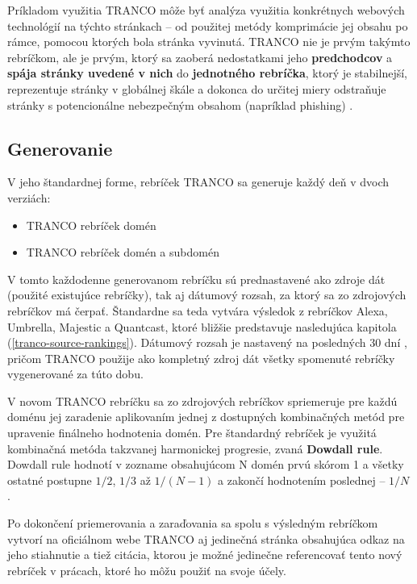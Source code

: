 Príkladom využitia TRANCO môže byť analýza využitia konkrétnych webových technológií na týchto stránkach -- od použitej metódy komprimácie jej obsahu po rámce, pomocou ktorých bola 
stránka vyvinutá. 
TRANCO nie je prvým takýmto rebríčkom, ale je prvým, ktorý sa zaoberá nedostatkami jeho \textbf{predchodcov} a \textbf{spája stránky uvedené v nich} do \textbf{jednotného rebríčka}, 
ktorý je stabilnejší, reprezentuje stránky v globálnej škále a dokonca do určitej miery odstraňuje stránky s potencionálne nebezpečným obsahom (napríklad phishing) \cite{tranco}. 

\subsection{Generovanie}
\label{tranco-generation}

V jeho štandardnej forme, rebríček TRANCO sa generuje každý deň v dvoch verziách:
\begin{itemize}
    \item TRANCO rebríček domén
    \item TRANCO rebríček domén a subdomén
\end{itemize}

V tomto každodenne generovanom rebríčku sú prednastavené ako zdroje dát (použité existujúce rebríčky), tak aj dátumový rozsah, za ktorý sa zo zdrojových rebríčkov má čerpať.
Štandardne sa teda vytvára výsledok z rebríčkov Alexa, Umbrella, Majestic a Quantcast, ktoré bližšie predstavuje nasledujúca kapitola (\ref{tranco-source-rankings}). 
Dátumový rozsah je nastavený na posledných 30 dní \cite{tranco-github}, pričom TRANCO použije ako kompletný zdroj dát všetky spomenuté rebríčky vygenerované za túto dobu. 

V novom TRANCO rebríčku sa zo zdrojových rebríčkov spriemeruje pre každú doménu jej zaradenie aplikovaním jednej z dostupných kombinačných metód pre upravenie finálneho hodnotenia domén.
Pre štandardný rebríček je využitá kombinačná metóda takzvanej harmonickej progresie, zvaná \textbf{Dowdall rule}. Dowdall rule hodnotí v zozname obsahujúcom N domén prvú skórom 1 a všetky ostatné postupne \(1/2\), \(1/3\) až \(1/(N-1)\) a zakončí hodnotením poslednej -- \(1/N\) \cite{tranco}\cite{tranco-homepage}.

Po dokončení priemerovania a zaraďovania sa spolu s výsledným rebríčkom vytvorí na oficiálnom webe TRANCO aj jedinečná stránka obsahujúca odkaz na jeho stiahnutie a tiež citácia, 
ktorou je možné jedinečne referencovať tento nový rebríček v prácach, ktoré ho môžu použiť na svoje účely.

